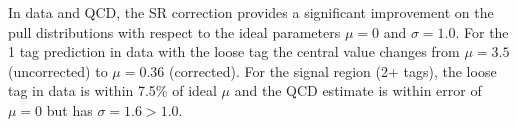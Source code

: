 In data and QCD, the SR correction provides a significant improvement on the pull distributions with respect to the ideal parameters $\mu=0$ and $\sigma=1.0$. For the 1 tag prediction in data with the loose tag the central value changes from $\mu=3.5$ (uncorrected) to $\mu=0.36$ (corrected). For the signal region (2+ tags), the loose tag in data is within 7.5\% of ideal $\mu$ and the QCD estimate is within error of $\mu=0$ but has $\sigma=1.6>1.0$. 

